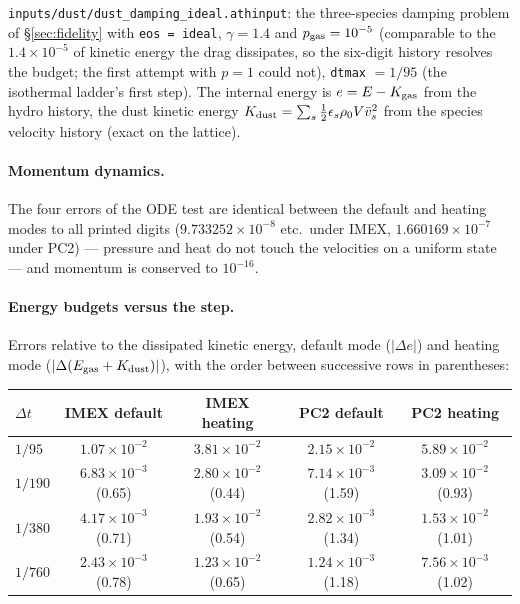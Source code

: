 \documentclass[11pt]{article}
\newcommand{\code}[1]{\texttt{#1}}
\newcommand{\file}[1]{\texttt{#1}}
\begin{document}
\file{inputs/dust/dust\_damping\_ideal.athinput}: the three-species damping problem of
\S\ref{sec:fidelity} with \code{eos = ideal}, $\gamma = 1.4$ and $p_{\rm gas} = 10^{-5}$
(comparable to the $1.4\times10^{-5}$ of kinetic energy the drag dissipates, so the
six-digit history resolves the budget; the first attempt with $p = 1$ could not),
\code{dtmax} $= 1/95$ (the isothermal ladder's first step). The internal energy is
$e = E - K_{\rm gas}$ from the hydro history, the dust kinetic energy
$K_{\rm dust} = \sum_s \tfrac12\epsilon_s\rho_0 V\bar v_s^2$ from the species velocity
history (exact on the lattice).

\paragraph{Momentum dynamics.} The four errors of the ODE test are identical between the
default and heating modes to all printed digits ($9.733252\times10^{-8}$ etc.\ under
IMEX, $1.660169\times10^{-7}$ under PC2) --- pressure and heat do not touch the
velocities on a uniform state --- and momentum is conserved to $10^{-16}$.

\paragraph{Energy budgets versus the step.} Errors relative to the dissipated kinetic
energy, default mode ($|\Delta e|$) and heating mode ($|\Delta(E_{\rm gas} + K_{\rm dust})|$),
with the order between successive rows in parentheses:

\begin{center}
\small
\begin{tabular}{@{}lcccc@{}}
\toprule
$\Delta t$ & IMEX default & IMEX heating & PC2 default & PC2 heating \\
\midrule
$1/95$  & $1.07\times10^{-2}$ & $3.81\times10^{-2}$ & $2.15\times10^{-2}$ & $5.89\times10^{-2}$ \\
$1/190$ & $6.83\times10^{-3}$ (0.65) & $2.80\times10^{-2}$ (0.44) & $7.14\times10^{-3}$ (1.59) & $3.09\times10^{-2}$ (0.93) \\
$1/380$ & $4.17\times10^{-3}$ (0.71) & $1.93\times10^{-2}$ (0.54) & $2.82\times10^{-3}$ (1.34) & $1.53\times10^{-2}$ (1.01) \\
$1/760$ & $2.43\times10^{-3}$ (0.78) & $1.23\times10^{-2}$ (0.65) & $1.24\times10^{-3}$ (1.18) & $7.56\times10^{-3}$ (1.02) \\
\bottomrule
\end{tabular}
\end{center}
\end{document}
